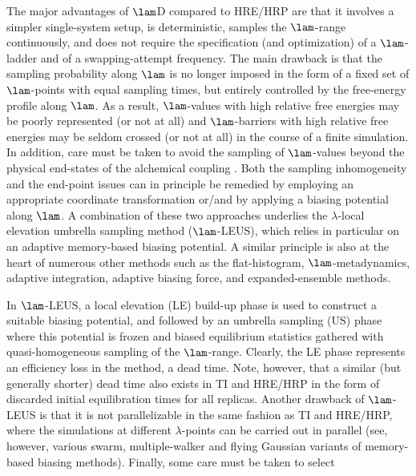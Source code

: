 The major advantages of $\lam$D compared to HRE/HRP are that it involves a simpler single-system setup, is deterministic, 
samples the $\lam$-range continuously, and does not require the specification (and 
optimization\cite{KO05.8,RA05.8,TR06.5,SI08.3,NA08.6,NA08.10,VO15.2,VO15.3,ZH16.2,SI16.5,SU17.3,SI17.7,MA18.8})
%
of a $\lam$-ladder and of a swapping-attempt frequency. The main drawback\cite{BI14.1} is that 
the sampling probability along $\lam$ is no longer imposed in the form of a fixed set of $\lam$-points 
with equal sampling times, but entirely controlled by the free-energy profile along $\lam$. 
As a result, $\lam$-values with high relative free energies may be poorly represented (or not at all) 
and $\lam$-barriers with high relative free energies may be seldom crossed (or not at all) in the 
course of a finite simulation. In addition, care must be taken to avoid the sampling of $\lam$-values 
beyond the physical end-states of the alchemical coupling\cite{KO96.1} . 
%
Both the sampling inhomogeneity and the end-point issues can in principle be remedied\cite{BI14.1} 
by employing an appropriate coordinate transformation\cite{KN11.2,DO11.2,WU11.1,KN11.1,DO13.1,ZH12.3,BI14.1,BI15.2} or/and 
by applying a biasing potential along $\lam$\cite{GU98.1,GU98.2,SO01.1,WU11.1,BI14.1,BI15.2}. A combination of these two 
approaches underlies the $\lambda$-local elevation umbrella sampling method\cite{BI14.1,BI14.2,BI15.1,BI15.2} ($\lam$-LEUS), 
which relies in particular on an adaptive memory-based biasing potential. 
%
A similar principle is also at the heart of numerous other methods such 
as the flat-histogram\cite{WA01.5,LA04.6}, $\lam$-metadynamics\cite{LA02.1,BA08.2,WU11.1}, 
adaptive integration\cite{FA04.3}, adaptive biasing force\cite{DA08.2},  
and expanded-ensemble\cite{LY92.1,LY94.1,LY96.2,ES07.1,ES07.2,PA11.7,RA18.2} methods. 

In $\lam$-LEUS, a local elevation\cite{HU94.3} (LE) build-up phase is used to construct a suitable biasing potential, and followed by an umbrella sampling\cite{TO74.1,TO77.1} (US) phase where this potential is frozen\cite{HA10.1} and biased equilibrium statistics gathered with quasi-homogeneous sampling of the $\lam$-range. Clearly, the LE phase represents an efficiency loss in the method, \ie{} a dead time. Note, however, that a similar (but generally shorter) dead time also exists in TI and HRE/HRP in the form of discarded initial equilibration times for all replicas. Another drawback of $\lam$-LEUS is that it is not parallelizable in the same fashion as TI and HRE/HRP, where the simulations at different $\lambda$-points can be carried out in parallel (see, however, various swarm\cite{HU98.6,BU15.5,KA18.6,AL18.2}, multiple-walker\cite{RA06.2,CO14.5} and flying Gaussian\cite{SU16.3,KR17.1} variants of memory-based biasing methods). 
Finally, some care must be taken to select 

